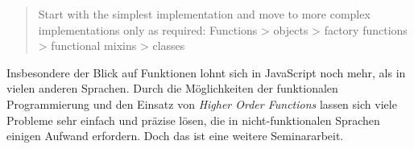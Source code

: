 \begin{quote}
Start with the simplest implementation and move to more complex implementations only
as required:
Functions > objects > factory functions > functional mixins > classes 
\citep{ElliottFunctionalMixins2017}
\end{quote}

Insbesondere der Blick auf Funktionen lohnt sich in JavaScript noch mehr, als in vielen anderen Sprachen. Durch die Möglichkeiten der funktionalen Programmierung und den Einsatz von \emph{Higher Order Functions} lassen sich viele Probleme sehr einfach und präzise lösen, die in nicht-funktionalen Sprachen einigen Aufwand erfordern. Doch das ist eine weitere Seminararbeit.